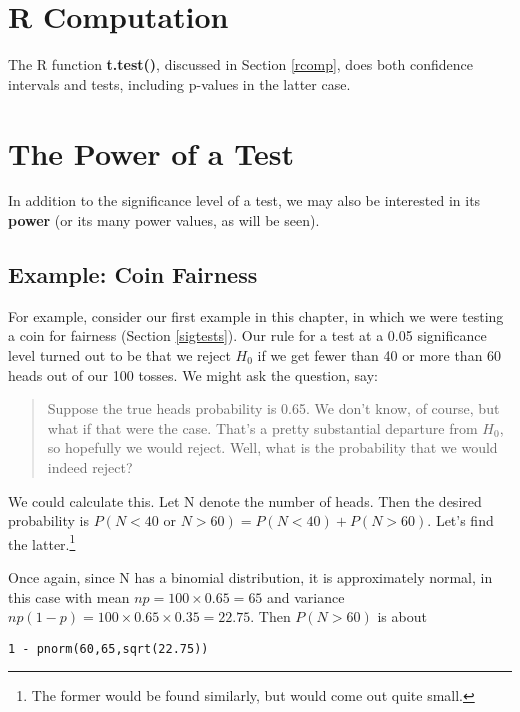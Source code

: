 \section{R Computation}

The R function {\bf t.test()}, discussed in Section \ref{rcomp}, does
both confidence intervals and tests, including p-values in the latter
case.

\section{The Power of a Test} 

In addition to the significance level of a test, we may also be
interested in its {\bf power} (or its many power values, as will be
seen).

\subsection{Example: Coin Fairness}

For example, consider our first example in this chapter, in which we
were testing a coin for fairness (Section \ref{sigtests}).  Our rule for
a test at a 0.05 significance level turned out to be that we reject
$H_0$ if we get fewer than 40 or more than 60 heads out of our 100
tosses.  We might ask the question, say:

\begin{quote}
Suppose the true heads probability is 0.65.  We don't know, of course,
but what if that were the case.  That's a pretty substantial departure
from $H_0$, so hopefully we would reject.  Well, what is the probability
that we would indeed reject?
\end{quote}

We could calculate this.  Let N denote the number of heads.  Then the
desired probability is $P(N < 40 \textrm{ or } N > 60) =  P(N < 40) +
P(N > 60)$.  Let's find the latter.\footnote{The former would be found
similarly, but would come out quite small.}

Once again, since N has a binomial distribution, it is approximately
normal, in this case with mean $np = 100 \times 0.65 = 65$ and variance
$np(1-p) = 100 \times 0.65 \times 0.35 = 22.75$.  Then $P(N > 60)$ is about

\begin{lstlisting}
1 - pnorm(60,65,sqrt(22.75))
\end{lstlisting}

% 
% 

